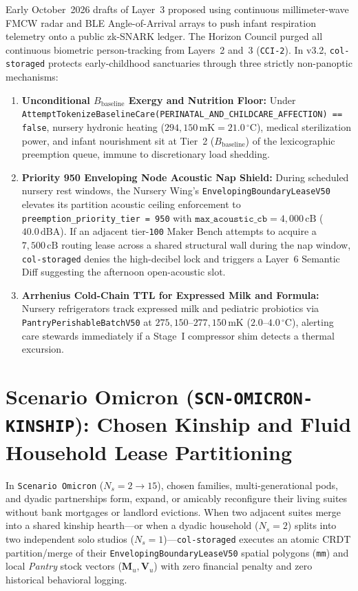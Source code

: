 Early October~2026 drafts of Layer~3 proposed using continuous millimeter-wave FMCW radar and BLE Angle-of-Arrival arrays to push infant respiration telemetry onto a public zk-SNARK ledger. The Horizon Council purged all continuous biometric person-tracking from Layers~2 and~3 (\texttt{CCI-2}). In v3.2, \texttt{col-storaged} protects early-childhood sanctuaries through three strictly non-panoptic mechanisms:
\begin{enumerate}
    \item \textbf{Unconditional $B_{\mathrm{baseline}}$ Exergy and Nutrition Floor:} Under \texttt{AttemptTokenizeBaselineCare(PERINATAL\_AND\_CHILDCARE\_AFFECTION) == false}, nursery hydronic heating ($294{,}150\,\mathrm{mK} = 21.0\,^\circ\mathrm{C}$), medical sterilization power, and infant nourishment sit at Tier~2 ($B_{\mathrm{baseline}}$) of the lexicographic preemption queue, immune to discretionary load shedding.
    \item \textbf{Priority 950 Enveloping Node Acoustic Nap Shield:} During scheduled nursery rest windows, the Nursery Wing's \texttt{EnvelopingBoundaryLeaseV50} elevates its partition acoustic ceiling enforcement to \texttt{preemption\_priority\_tier = 950} with $\texttt{max\_acoustic\_cb} = 4{,}000\,\mathrm{cB}$ ($40.0\,\mathrm{dBA}$). If an adjacent tier-\texttt{100} Maker Bench attempts to acquire a $7{,}500\,\mathrm{cB}$ routing lease across a shared structural wall during the nap window, \texttt{col-storaged} denies the high-decibel lock and triggers a Layer~6 Semantic Diff suggesting the afternoon open-acoustic slot.
    \item \textbf{Arrhenius Cold-Chain TTL for Expressed Milk and Formula:} Nursery refrigerators track expressed milk and pediatric probiotics via \texttt{PantryPerishableBatchV50} at $275{,}150\text{--}277{,}150\,\mathrm{mK}$ ($2.0\text{--}4.0\,^\circ\mathrm{C}$), alerting care stewards immediately if a Stage~I compressor shim detects a thermal excursion.
\end{enumerate}

\section{Scenario Omicron (\texttt{SCN-OMICRON-KINSHIP}): Chosen Kinship and Fluid Household Lease Partitioning}
\label{sec:ch11-omicron}

In \texttt{Scenario Omicron} ($N_s = 2 \to 15$), chosen families, multi-generational pods, and dyadic partnerships form, expand, or amicably reconfigure their living suites without bank mortgages or landlord evictions. When two adjacent suites merge into a shared kinship hearth---or when a dyadic household ($N_s = 2$) splits into two independent solo studios ($N_s = 1$)---\texttt{col-storaged} executes an atomic CRDT partition/merge of their \texttt{EnvelopingBoundaryLeaseV50} spatial polygons (\texttt{mm}) and local \textit{Pantry} stock vectors ($\mathbf{M}_u, \mathbf{V}_u$) with zero financial penalty and zero historical behavioral logging.

